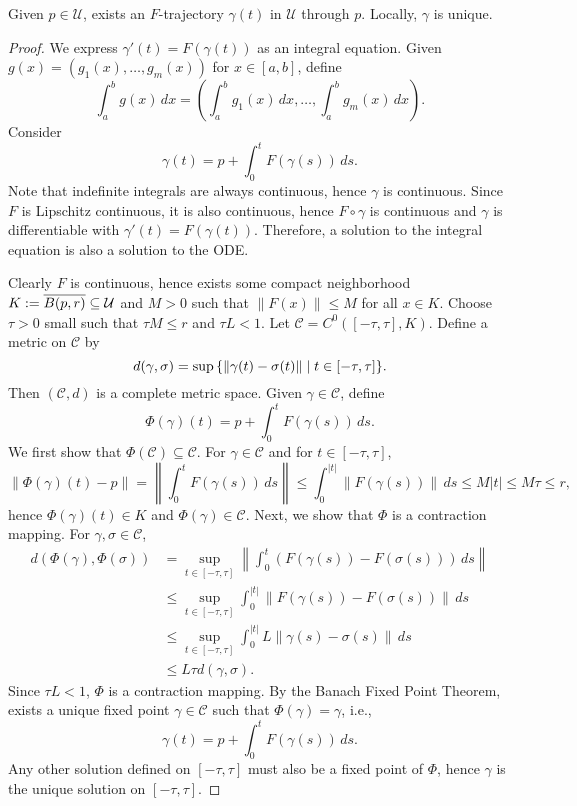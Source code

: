 \begin{thm}[Picard]
    Given $p \in \mathcal U$, exists an $F$-trajectory $\gamma(t)$ in $\mathcal U$ through $p$. Locally, $\gamma$ is unique.
    \begin{proof}
        We express $\gamma'(t) = F(\gamma(t))$ as an integral equation. Given $g(x) = (g_1(x), \ldots, g_m(x))$ for $x \in [a, b]$, define
        \[
        \int_a^b g(x) \, dx = \left(\int_a^b g_1(x) \, dx, \ldots, \int_a^b g_m(x) \, dx\right).
        \]
        Consider
        \[
        \gamma(t) = p + \int_0^t F(\gamma(s)) \, ds.
        \]
        Note that indefinite integrals are always continuous, hence $\gamma$ is continuous. Since $F$ is Lipschitz continuous, it is also continuous, hence $F \circ \gamma$ is continuous and $\gamma$ is differentiable with $\gamma'(t) = F(\gamma(t))$. Therefore, a solution to the integral equation is also a solution to the ODE.

        Clearly $F$ is continuous, hence exists some compact neighborhood $K := \Bar{B(p, r)} \subseteq \mathcal U$ and $M > 0$ such that $\|F(x)\| \leq M$ for all $x \in K$. Choose $\tau > 0$ small such that $\tau M \leq r$ and $\tau L < 1$. Let $\mathcal C = C^0([-\tau, \tau], K)$. Define a metric on $\mathcal C$ by
        \[
        d(\gamma, \sigma) = \sup\set{\|\gamma(t) - \sigma(t)\| \mid t \in [-\tau, \tau]}.
        \]
        Then $(\mathcal C, d)$ is a complete metric space. Given $\gamma \in \mathcal C$, define
        \[
        \Phi(\gamma)(t) = p + \int_0^t F(\gamma(s)) \, ds.
        \]
        We first show that $\Phi(\mathcal C) \subseteq \mathcal C$. For $\gamma \in \mathcal C$ and for $t \in [-\tau, \tau]$,
        \[
        \|\Phi(\gamma)(t) - p\| = \left\|\int_0^t F(\gamma(s)) \, ds\right\| \leq \int_0^{|t|} \|F(\gamma(s))\| \, ds \leq M |t| \leq M \tau \leq r,
        \]
        hence $\Phi(\gamma)(t) \in K$ and $\Phi(\gamma) \in \mathcal C$. Next, we show that $\Phi$ is a contraction mapping. For $\gamma, \sigma \in \mathcal C$,
        \begin{align*}
            d(\Phi(\gamma), \Phi(\sigma)) &= \sup_{t \in [-\tau, \tau]} \left\|\int_0^t (F(\gamma(s)) - F(\sigma(s))) \, ds\right\| \\
            &\leq \sup_{t \in [-\tau, \tau]} \int_0^{|t|} \|F(\gamma(s)) - F(\sigma(s))\| \, ds \\
            &\leq \sup_{t \in [-\tau, \tau]} \int_0^{|t|} L \|\gamma(s) - \sigma(s)\| \, ds \\
            &\leq L \tau d(\gamma, \sigma).
        \end{align*}
        Since $\tau L < 1$, $\Phi$ is a contraction mapping. By the Banach Fixed Point Theorem, exists a unique fixed point $\gamma \in \mathcal C$ such that $\Phi(\gamma) = \gamma$, i.e.,
        \[
        \gamma(t) = p + \int_0^t F(\gamma(s)) \, ds.
        \]
        Any other solution defined on $[-\tau, \tau]$ must also be a fixed point of $\Phi$, hence $\gamma$ is the unique solution on $[-\tau, \tau]$.
    \end{proof}
\end{thm}

